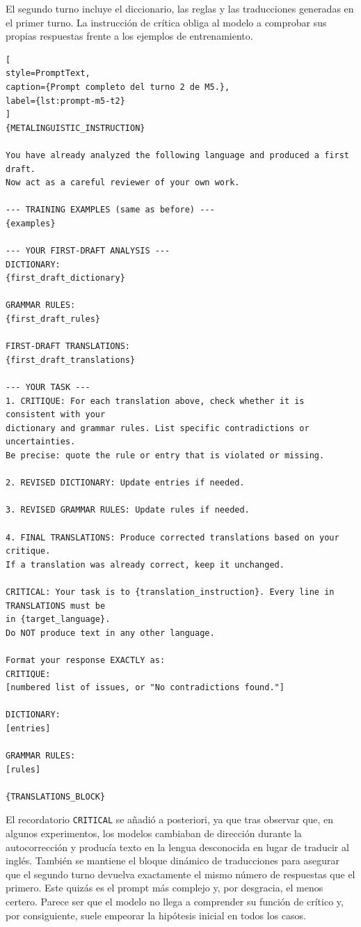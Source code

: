 El segundo turno incluye el diccionario, las reglas y las traducciones generadas en el primer turno. La instrucción de crítica obliga al modelo a comprobar sus propias respuestas frente a los ejemplos de entrenamiento.

\begin{lstlisting}[
style=PromptText,
caption={Prompt completo del turno 2 de M5.},
label={lst:prompt-m5-t2}
]
{METALINGUISTIC_INSTRUCTION}

You have already analyzed the following language and produced a first draft.
Now act as a careful reviewer of your own work.

--- TRAINING EXAMPLES (same as before) ---
{examples}

--- YOUR FIRST-DRAFT ANALYSIS ---
DICTIONARY:
{first_draft_dictionary}

GRAMMAR RULES:
{first_draft_rules}

FIRST-DRAFT TRANSLATIONS:
{first_draft_translations}

--- YOUR TASK ---
1. CRITIQUE: For each translation above, check whether it is consistent with your
dictionary and grammar rules. List specific contradictions or uncertainties.
Be precise: quote the rule or entry that is violated or missing.

2. REVISED DICTIONARY: Update entries if needed.

3. REVISED GRAMMAR RULES: Update rules if needed.

4. FINAL TRANSLATIONS: Produce corrected translations based on your critique.
If a translation was already correct, keep it unchanged.

CRITICAL: Your task is to {translation_instruction}. Every line in TRANSLATIONS must be
in {target_language}.
Do NOT produce text in any other language.

Format your response EXACTLY as:
CRITIQUE:
[numbered list of issues, or "No contradictions found."]

DICTIONARY:
[entries]

GRAMMAR RULES:
[rules]

{TRANSLATIONS_BLOCK}
\end{lstlisting}

El recordatorio \texttt{CRITICAL} se añadió a posteriori, ya que tras observar que, en algunos experimentos, los modelos cambiaban de dirección durante la autocorrección y producía texto en la lengua desconocida en lugar de traducir al inglés. También se mantiene el bloque dinámico de traducciones para asegurar que el segundo turno devuelva exactamente el mismo número de respuestas que el primero. Este quizás es el prompt más complejo y, por desgracia, el menos certero. Parece ser que el modelo no llega a comprender su función de crítico y, por consiguiente, suele empeorar la hipótesis inicial en todos los casos.

